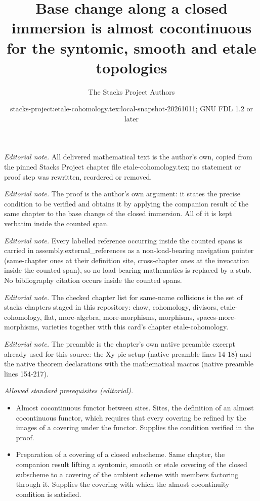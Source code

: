 \documentclass[10pt,a4paper]{amsart}
\title{Base change along a closed immersion is almost cocontinuous for the syntomic, smooth and etale topologies}
\author{The Stacks Project Authors}
\date{stacks-project:etale-cohomology.tex:local-snapshot-20261011; GNU FDL 1.2 or later}
\theoremstyle{plain}
\theoremstyle{definition}
\theoremstyle{remark}
\numberwithin{equation}{subsection}
\begin{document}
\maketitle
\noindent\textit{Editorial note.} All delivered mathematical text is the author's own, copied from the pinned Stacks Project chapter file etale-cohomology.tex; no statement or proof step was rewritten, reordered or removed.\par\medskip
\noindent\textit{Editorial note.} The proof is the author's own argument: it states the precise condition to be verified and obtains it by applying the companion result of the same chapter to the base change of the closed immersion. All of it is kept verbatim inside the counted span.\par\medskip
\noindent\textit{Editorial note.} Every labelled reference occurring inside the counted spans is carried in assembly.external\_references as a non-load-bearing navigation pointer (same-chapter ones at their definition site, cross-chapter ones at the invocation inside the counted span), so no load-bearing mathematics is replaced by a stub. No bibliography citation occurs inside the counted spans.\par\medskip
\noindent\textit{Editorial note.} The checked chapter list for same-name collisions is the set of stacks chapters staged in this repository: chow, cohomology, divisors, etale-cohomology, flat, more-algebra, more-morphisms, morphisms, spaces-more-morphisms, varieties together with this card's chapter etale-cohomology.\par\medskip
\noindent\textit{Editorial note.} The preamble is the chapter's own native preamble excerpt already used for this source: the Xy-pic setup (native preamble lines 14-18) and the native theorem declarations with the mathematical macros (native preamble lines 154-217).\par\medskip
\noindent\textit{Allowed standard prerequisites (editorial).}\begin{itemize}
\item Almost cocontinuous functor between sites. Sites, the definition of an almost cocontinuous functor, which requires that every covering be refined by the images of a covering under the functor. Supplies the condition verified in the proof.
\item Preparation of a covering of a closed subscheme. Same chapter, the companion result lifting a syntomic, smooth or etale covering of the closed subscheme to a covering of the ambient scheme with members factoring through it. Supplies the covering with which the almost cocontinuity condition is satisfied.
\end{itemize}\medskip
\end{document}
